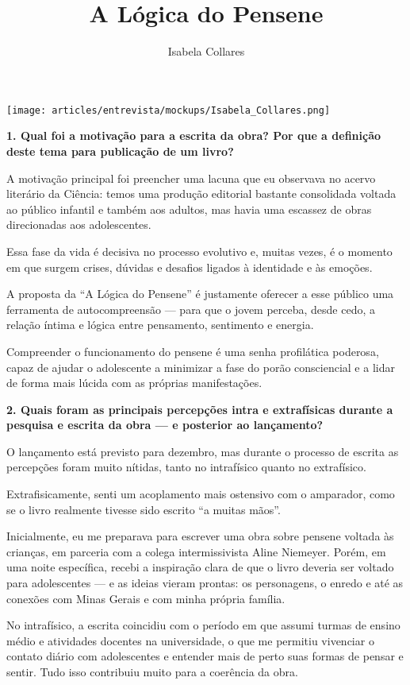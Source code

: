 \documentclass{gescons}
\author{Isabela Collares}
\title{A Lógica do Pensene}
\begin{document}
    \makeentrevistatitle

    \begin{multicols}{3}

\begin{center}
    \texttt{[image: articles/entrevista/mockups/Isabela\_Collares.png]}
\end{center}


\textbf{1. Qual foi a motivação para a escrita da obra? Por que a definição deste tema para publicação de um livro?}

A motivação principal foi preencher uma lacuna que eu observava no acervo literário da Ciência: temos uma produção editorial bastante consolidada voltada ao público infantil e também aos adultos, mas havia uma escassez de obras direcionadas aos adolescentes.

Essa fase da vida é decisiva no processo evolutivo e, muitas vezes, é o momento em que surgem crises, dúvidas e desafios ligados à identidade e às emoções.

A proposta da ``A Lógica do Pensene'' é justamente oferecer a esse público uma ferramenta de autocompreensão --- para que o jovem perceba, desde cedo, a relação íntima e lógica entre pensamento, sentimento e energia.

Compreender o funcionamento do pensene é uma senha profilática poderosa, capaz de ajudar o adolescente a minimizar a fase do porão consciencial e a lidar de forma mais lúcida com as próprias manifestações.

\textbf{2. Quais foram as principais percepções intra e extrafísicas durante a pesquisa e escrita da obra --- e posterior ao lançamento?}

O lançamento está previsto para dezembro, mas durante o processo de escrita as percepções foram muito nítidas, tanto no intrafísico quanto no extrafísico.

Extrafisicamente, senti um acoplamento mais ostensivo com o amparador, como se o livro realmente tivesse sido escrito ``a muitas mãos''.

Inicialmente, eu me preparava para escrever uma obra sobre pensene voltada às crianças, em parceria com a colega intermissivista Aline Niemeyer. Porém, em uma noite específica, recebi a inspiração clara de que o livro deveria ser voltado para adolescentes --- e as ideias vieram prontas: os personagens, o enredo e até as conexões com Minas Gerais e com minha própria família.

No intrafísico, a escrita coincidiu com o período em que assumi turmas de ensino médio e atividades docentes na universidade, o que me permitiu vivenciar o contato diário com adolescentes e entender mais de perto suas formas de pensar e sentir. Tudo isso contribuiu muito para a coerência da obra.


\end{multicols}
\end{document}
